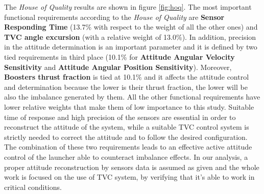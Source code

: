 \documentclass[12pt,fleqn,openany]{book} %
\begin{document}
\noindent The \textit{House of Quality} results are shown in figure \hypertarget{fig:hoq}{\ref{fig:hoq}}. The most important functional requirements according to the \textit{House of Quality} are \textbf{Sensor Responding Time} (13.7\% with respect to the weight of all the other ones) and \textbf{TVC angle excursion} (with a relative weight of 13.0\%). In addition, precision in the attitude determination is an important parameter and it is defined by two tied requirements in third place (10.1\% for \textbf{Attitude Angular Velocity Sensitivity} and \textbf{Attitude Angular Position Sensitivity}). Moreover, \textbf{Boosters thrust fraction} is tied at 10.1\% and it affects the attitude control and determination because the lower is their thrust fraction, the lower will be also the imbalance generated by them. All the other functional requirements have lower relative weights that make them of low importance to this study. Suitable time of response and high precision of the sensors are essential in order to reconstruct the attitude of the system, while a suitable TVC control system is strictly needed to correct the attitude and to follow the desired configuration. The combination of these two requirements leads to an effective active attitude control of the launcher able to counteract imbalance effects. In our analysis, a proper attitude reconstruction by sensors data is assumed as given and the whole work is focused on the use of TVC system, by verifying that it's able to work in critical conditions.  
\end{document}

